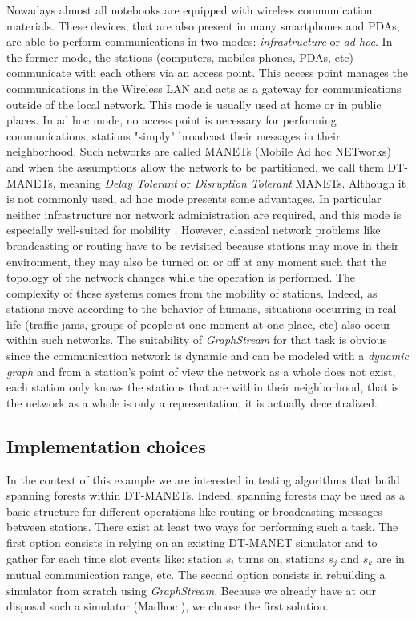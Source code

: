 \documentclass{svmult}
\begin{document}
Nowadays almost all notebooks are equipped with wireless communication materials.
These devices, that are also present in many smartphones and PDAs,
are able to perform communications in two modes: {\em infrastructure} or {\em
  ad hoc}.   
In the former mode, the stations (computers, mobiles phones, PDAs, etc)
communicate with each others via an access point. This access point manages the
communications in the Wireless LAN and acts as a gateway for communications
outside of the local network. This mode is usually used at home or in public
places.  
In ad hoc mode, no access point is necessary for performing communications,
stations "simply" broadcast their messages in their neighborhood. 
Such networks are called MANETs (Mobile Ad hoc NETworks) and when the
assumptions allow the network to be partitioned, we call them DT-MANETs,
meaning {\em Delay Tolerant} or {\em Disruption Tolerant} MANETs.  
Although it is not commonly used, ad hoc mode presents some advantages. In
particular neither infrastructure nor network administration are required, and
this mode is especially well-suited for mobility \cite{Hogie2006c}.
However, classical network problems like broadcasting or routing have to be
revisited because stations may move in their environment, they may also be
turned on or off at any moment such that the topology of the network changes
while the operation is performed. 
The complexity of these systems comes from the mobility of stations. 
Indeed, as stations move according to the behavior of humans, situations
occurring in real life (traffic jams, groups of people at one moment at one
place, etc) also occur within such networks.
The suitability of \emph{GraphStream} for that task is obvious since the
communication network is dynamic and can be modeled with a 
\emph{dynamic graph} and from a station's point of view the network as a whole
does not exist, each station only knows the stations that are within their
neighborhood, that is the network as a whole is only a representation, it is
actually decentralized. 

\subsection{Implementation choices}


In the context of this example we are interested in testing algorithms that
build spanning forests within DT-MANETs. 
Indeed, spanning forests may be used as a basic structure for different
operations like routing or broadcasting messages between stations.
There exist at least two ways for performing such a task.
The first option consists in relying on an existing DT-MANET simulator and to
gather for each time slot events like: station $s_i$ turns on, stations $s_j$
and $s_k$ are in mutual communication range, etc. 
The second option consists in rebuilding a simulator from scratch using 
\emph{GraphStream}.
Because we already have at our disposal such a simulator ({\sc Madhoc}
\cite{Hogie2007}), we choose the first solution.
\end{document}
